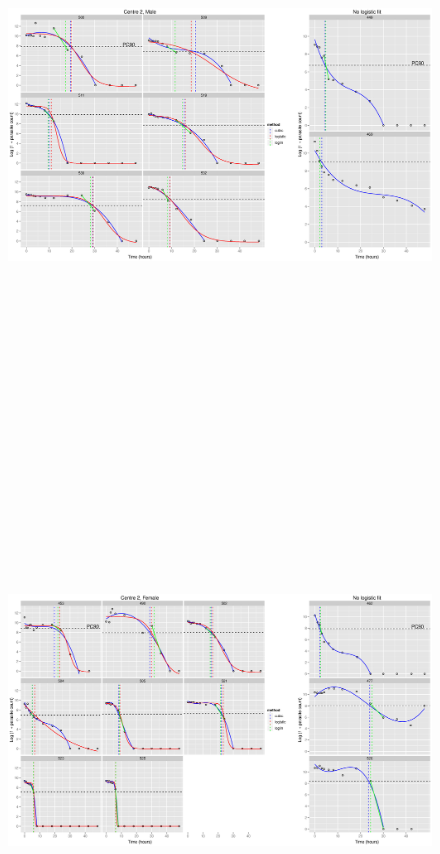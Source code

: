 \begin{figure}
\includegraphics[height=150mm]{Afits2M.eps}
\end{figure}
\begin{figure}
\includegraphics[height=150mm]{Afits2F.eps}
\end{figure}

